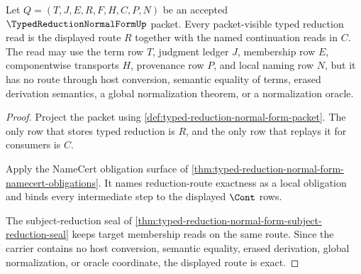 \begin{theorem}
\label{thm:typed-reduction-normal-form-route-exactness}
Let $Q=(T,J,E,R,F,H,C,P,N)$ be an accepted $\TypedReductionNormalFormUp$ packet. Every packet-visible typed reduction read is the displayed route $R$ together with the named continuation reads in $C$. The read may use the term row $T$, judgment ledger $J$, membership row $E$, componentwise transports $H$, provenance row $P$, and local naming row $N$, but it has no route through host conversion, semantic equality of terms, erased derivation semantics, a global normalization theorem, or a normalization oracle.
\end{theorem}
\begin{proof}
Project the packet using \autoref{def:typed-reduction-normal-form-packet}. The only row that stores typed reduction is $R$, and the only row that replays it for consumers is $C$.

Apply the NameCert obligation surface of \autoref{thm:typed-reduction-normal-form-namecert-obligations}. It names reduction-route exactness as a local obligation and binds every intermediate step to the displayed $\Cont$ rows.

The subject-reduction seal of \autoref{thm:typed-reduction-normal-form-subject-reduction-seal} keeps target membership reads on the same route. Since the carrier contains no host conversion, semantic equality, erased derivation, global normalization, or oracle coordinate, the displayed route is exact.
\end{proof}

